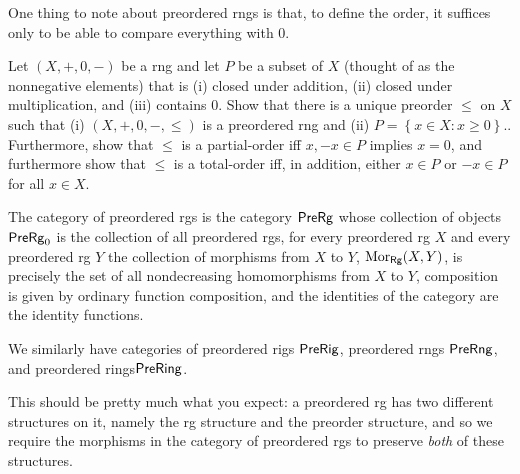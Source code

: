 One thing to note about preordered rngs is that, to define the order, it suffices only to be able to compare everything with $0$.
\begin{exr}\label{exr1.1.41}
Let $(X,+,0,-)$ be a rng and let $P$ be a subset of $X$ (thought of as the nonnegative elements) that is (i) closed under addition, (ii) closed under multiplication, and (iii) contains $0$.  Show that there is a unique preorder $\leq$ on $X$ such that (i) $(X,+,0,-,\leq )$ is a preordered rng and (ii) $P=\left\{ x\in X:x\geq 0\right\}$..  Furthermore, show that $\leq$ is a partial-order iff $x,-x\in P$ implies $x=0$, and furthermore show that $\leq$ is a total-order iff, in addition, either $x\in P$ or $-x\in P$ for all $x\in X$.
\end{exr}
\begin{dfn}
The category of preordered rgs is the category $\Pre \Rg$\index[notation]{$\Pre \Rg$} whose collection of objects $\mathsf{Pre} \mathsf{Rg} _0$ is the collection of all preordered rgs, for every preordered rg $X$ and every preordered rg $Y$ the collection of morphisms from $X$ to $Y$, $\operatorname{Mor} _{\mathsf{Rg}}(X,Y)$, is precisely the set of all nondecreasing homomorphisms from $X$ to $Y$, composition is given by ordinary function composition, and the identities of the category are the identity functions.
\begin{rmk}
We similarly have categories of preordered rigs $\Pre \Rig$\index[notation]{$\Pre \Rig$}, preordered rngs $\Pre \Rng$\index[notation]{$\Pre \Rng$}, and preordered rings$\Pre \Ring$\index[notation]{$\Pre \Ring$}.
\end{rmk}
\end{dfn}
This should be pretty much what you expect:  a preordered rg has two different structures on it, namely the rg structure and the preorder structure, and so we require the morphisms in the category of preordered rgs to preserve \emph{both} of these structures.

